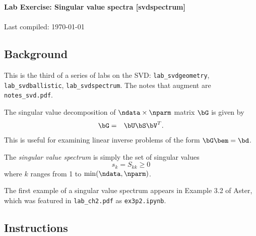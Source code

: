 \documentclass[11pt,titlepage,fleqn]{article}
\newcommand{\nfile}{{\tt notes\_svd.pdf}}
\begin{document}

\begin{spacing}{1.2}
\centering
{\large \bf Lab Exercise: Singular value spectra [svdspectrum]} \\
\cltag\ \\
Last compiled: \today
\end{spacing}


\subsection*{Background}

This is the third of a series of labs on the SVD: \verb+lab_svdgeometry+, \verb+lab_svdballistic+, \verb+lab_svdspectrum+. The notes that augment \citet{Aster} are \nfile.

The singular value decomposition of $\ndata \times \nparm$ matrix $\bG$ is given by
%
\begin{eqnarray*}
\bG &=& \bU\bS\bV^T.
\end{eqnarray*}
%
This is useful for examining linear inverse problems of the form $\bG\bem = \bd$.

The {\em singular value spectrum} is simply the set of singular values
%
\begin{equation*}
s_k = S_{kk} \ge 0
\end{equation*}
%
where $k$ ranges from 1 to $\min(\ndata,\nparm)$.

The first example of a singular value spectrum appears in Example 3.2 of Aster, which was featured in \verb+lab_ch2.pdf+ as \verb+ex3p2.ipynb+.


\subsection*{Instructions}
\end{document}
